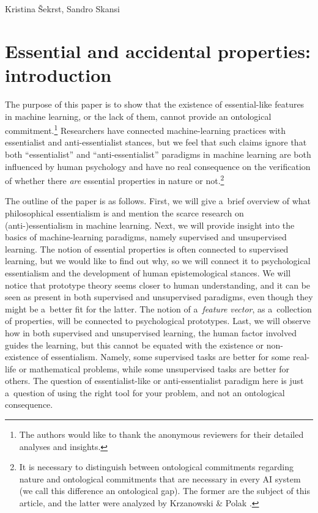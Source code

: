 \begin{artengenv2auth}{Kristina Šekrst, Sandro Skansi}
\section*{Essential and accidental properties: introduction}
\lettrine[loversize=0.13,lines=2,lraise=-0.03,nindent=0em,findent=0.2pt]%
{T}{}he purpose of this paper is to show that the existence of essential-like features in machine learning, or the lack of them, cannot provide an ontological commitment.\footnote{The authors would like to thank the anonymous reviewers for their detailed analyses and insights.} Researchers have connected machine-learning practices with essentialist and anti-essentialist stances, but we feel that such claims ignore that both ``essentialist'' and ``anti-essentialist'' paradigms in machine learning are both influenced by human psychology and have no real consequence on the verification of whether there \textit{are} essential properties in nature or not.\footnote{It is necessary to distinguish between ontological commitments regarding nature and ontological commitments that are necessary in every AI system (we call this difference an ontological gap). The former are the subject of this article, and the latter were analyzed by Krzanowski \& Polak
\parencites*[][]{krzanowski_ontology_2022}[][]{krzanowski_meta-ontology_2022}.%
}

The outline of the paper is as follows. First, we will give a~brief overview of what philosophical essentialism is and mention the scarce research on (anti-)essentialism in machine learning. Next, we will provide insight into the basics of machine-learning paradigms, namely supervised and unsupervised learning. The notion of essential properties is often connected to supervised learning, but we would like to find out why, so we will connect it to psychological essentialism and the development of human epistemological stances. We will notice that prototype theory seems closer to human understanding, and it can be seen as present in both supervised and unsupervised paradigms, even though they might be a~better fit for the latter. The notion of a~\textit{feature} \textit{vector}, as a~collection of properties, will be connected to psychological prototypes. Last, we will observe how in both supervised and unsupervised learning, the human factor involved guides the learning, but this cannot be equated with the existence or non-existence of essentialism. Namely, some supervised tasks are better for some real-life or mathematical problems, while some unsupervised tasks are better for others. The question of essentialist-like or anti-essentialist paradigm here is just a~question of using the right tool for your problem, and not an ontological consequence.


\end{artengenv2auth}
